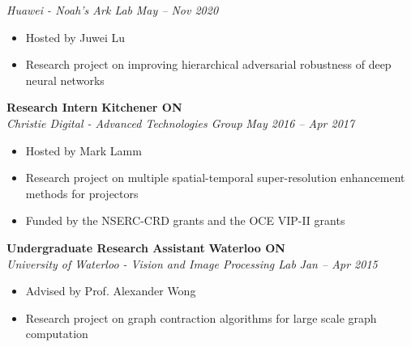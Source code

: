       \textit{Huawei - Noah's Ark Lab}
      \hfill
      \textit{May -- Nov 2020}
      \begin{itemize}
        \setlength\itemsep{0.2em}
        \item Hosted by Juwei Lu
        \item Research project on improving hierarchical adversarial robustness of deep neural networks 
      \end{itemize}
      \vspace{\interlist}
      \textbf{Research Intern}
      \hfill
      \textbf{Kitchener ON}\\
      \textit{Christie Digital - Advanced Technologies Group}
      \hfill
      \textit{May 2016 -- Apr 2017}
      \begin{itemize}
        \setlength\itemsep{0.2em}
        \item Hosted by Mark Lamm
        \item Research project on multiple spatial-temporal super-resolution enhancement methods for projectors
        \item Funded by the NSERC-CRD grants and the OCE VIP-II grants
      \end{itemize}
      \vspace{\interlist}
      \textbf{Undergraduate Research Assistant}
      \hfill
      \textbf{Waterloo ON}\\
      \textit{University of Waterloo - Vision and Image Processing Lab}
      \hfill
      \textit{Jan -- Apr 2015}
      \begin{itemize}
        \setlength\itemsep{0.2em}
        \item Advised by Prof. Alexander Wong
        \item Research project on graph contraction algorithms for large scale graph computation
      \end{itemize}

